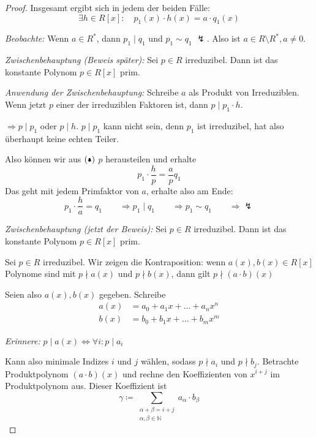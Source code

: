 \documentclass[a4paper,12pt,numbers=noenddot,parskip=full]{scrartcl}
\newcommand{\setN}{\mathbb{N}}
\theoremstyle{dotless}
\theoremstyle{remark}
\begin{document}
\begin{proof}
		Insgesamt ergibt sich in jedem der beiden Fälle:
		\begin{equation*}
			\exists h \in R[x]: \quad p_1(x) \cdot h(x) = a \cdot q_1(x) \tag{\bell}
		\end{equation*}
		
		\textit{Beobachte:} Wenn $a \in R^*$, dann $p_1 \mid q_1$ und $p_1 \sim q_1$ $\lightning$. Also ist $a \in R \setminus R^*, a \neq 0$.
		
		\textit{Zwischenbehauptung (Beweis später):} Sei $p \in R$ irreduzibel. Dann ist das konstante Polynom $p \in R[x]$ prim.
		
		\textit{Anwendung der Zwischenbehauptung:} Schreibe $a$ als Produkt von Irreduziblen. Wenn jetzt $p$ einer der irreduziblen Faktoren ist, dann $p \mid p_1 \cdot h$.
		
		$\Rightarrow p \mid p_1$ oder $p \mid h$. $p \mid p_1$ kann nicht sein, denn $p_1$ ist irreduzibel, hat also überhaupt keine echten Teiler.
		
		Also können wir aus $(\bell)$ $p$ herausteilen und erhalte
		\begin{equation*}
			p_1 \cdot \frac{h}{p} = \frac{a}{p} q_1
		\end{equation*}
		Das geht mit jedem Primfaktor von $a$, erhalte also am Ende:
		\begin{equation*}
			p_1 \cdot \frac{h}{a} = q_1 \qquad\Rightarrow p_1 \mid q_1 \qquad\Rightarrow p_1 \sim q_1 \qquad\Rightarrow \lightning
		\end{equation*}
	
		\textit{Zwischenbehauptung (jetzt der Beweis):} Sei $p \in R$ irreduzibel. Dann ist das konstante Polynom $p \in R[x]$ prim.
		
		Sei $p \in R$ irreduzibel. Wir zeigen die Kontraposition: wenn $a(x), b(x) \in R[x]$ Polynome sind mit $p \nmid a(x)$ und $p \nmid b(x)$, dann gilt $p \nmid (a \cdot b)(x)$
		
		Seien also $a(x), b(x)$ gegeben. Schreibe
		\begin{align*}
			a(x) &= a_0 + a_1 x + \dots + a_n x^n \\
			b(x) &= b_0 + b_1 x + \dots + b_m x^m
		\end{align*}
		
		\textit{Erinnere:} $p \mid a(x) \Leftrightarrow \forall i: p \mid a_i$
		
		Kann also minimale Indizes $i$ und $j$ wählen, sodass $p \nmid a_i$ und $p \nmid b_j$. Betrachte Produktpolynom $(a \cdot b)(x)$ und rechne den Koeffizienten von $x^{i+j}$ im Produktpolynom aus. Dieser Koeffizient ist
		\begin{equation*}
			\gamma \coloneqq \sum_{\substack{\alpha + \beta = i + j \\ \alpha, \beta \in \setN}} a_\alpha \cdot b_\beta
		\end{equation*}
		

\end{proof}
\end{document}
